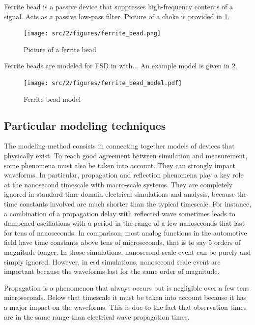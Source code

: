 Ferrite bead is a passive device that suppresses high-frequency contents of a signal.
Acts as a passive low-pass filter.
Picture of a choke is provided in \ref{fig:ferrite-bead}.

\begin{figure}[!h]
  \centering
  \texttt{[image: src/2/figures/ferrite\_bead.png]}
  \caption{Picture of a ferrite bead}
  \label{fig:ferrite-bead}
\end{figure}

Ferrite beads are modeled for ESD in \cite{mixedModeESDSims} with...
An example model is given in \ref{fig:ferrite-model}.

\begin{figure}[!h]
  \centering
  \texttt{[image: src/2/figures/ferrite\_bead\_model.pdf]}
  \caption{Ferrite bead model}
  \label{fig:ferrite-model}
\end{figure}

\subsection{Particular modeling techniques}

The modeling method consists in connecting together models of devices that physically exist.
To reach good agreement between simulation and measurement, some phenomena must also be taken into account.
They can strongly impact waveforms.
In particular, propagation and reflection phenomena play a key role at the nanosecond timescale with macro-scale systems.
They are completely ignored in standard time-domain electrical simulations and analysis, because the time constants involved are much shorter than the typical timescale.
For instance, a combination of a propagation delay with reflected wave sometimes leads to dampened oscillations with a period in the range of a few nanoseconds that last for tens of nanoseconds.
In comparison, most analog functions in the automotive field have time constants above tens of microseconds, that is to say 5 orders of magnitude longer.
In those simulations, nanosecond scale event can be purely and simply ignored.
However, in \gls{esd} simulations, nanosecond scale event are important because the waveforms last for the same order of magnitude.

Propagation is a phenomenon that always occurs but is negligible over a few tens microseconds.
Below that timescale it must be taken into account because it has a major impact on the waveforms.
This is due to the fact that observation times are in the same range than electrical wave propagation times.

